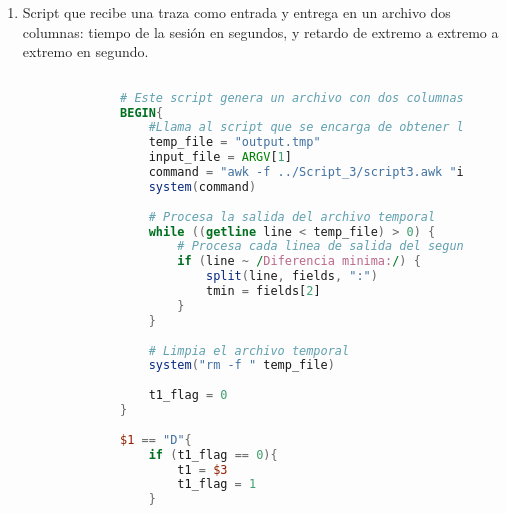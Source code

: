 \begin{enumerate}
\begin{figure}[H]
\begin{lstlisting}[frame=single, breaklines=true, basicstyle=\footnotesize\ttfamily, breakatwhitespace=false, 
        columns=flexible, tabsize=2, showstringspaces=false, language=AWK]
        $1 == "D"{  # Solo se calcula la diferencia cuando hay un paquete recibido
            diff = $2 - $3 # Ya que solo es la diferencia no se toma encuenta que el numero que se obtiene puede ser negativo
            if (diff < min_diff){
                min_diff = diff
            }
        }

        END{
            print "Archivo de entrada:", input_file
            print "Diferencia minima:", min_diff   
            print ""
        }

    \end{lstlisting}
    \label{fig:scriptDiferencia}
  \end{figure}

  \noindent Para la ejecuci\'on de este script usaremos como base la forma vista en el punto anterior. 
  Cambiando el nombre del script de \textit{script2.awk} a \textit{script3.awk}

  \item Script que recibe una traza como entrada y entrega en un archivo dos columnas: tiempo de la sesi\'on en segundos, 
  y retardo de extremo a extremo a extremo en segundo.
  \begin{figure}[H]
    \centering
    \begin{lstlisting}[frame=single, breaklines=true, basicstyle=\footnotesize\ttfamily, breakatwhitespace=false, 
        columns=flexible, tabsize=2, showstringspaces=false, language=AWK] 
  
        # Este script genera un archivo con dos columnas: tiempo de la sesion y retardo extremo a extremo.
        BEGIN{
            #Llama al script que se encarga de obtener la diferencia minima
            temp_file = "output.tmp"
            input_file = ARGV[1]
            command = "awk -f ../Script_3/script3.awk "input_file " > " temp_file
            system(command)
        
            # Procesa la salida del archivo temporal
            while ((getline line < temp_file) > 0) {
                # Procesa cada linea de salida del segundo script
                if (line ~ /Diferencia minima:/) {
                    split(line, fields, ":")
                    tmin = fields[2]
                }
            }
        
            # Limpia el archivo temporal
            system("rm -f " temp_file)
        
            t1_flag = 0
        }
        
        $1 == "D"{
            if (t1_flag == 0){
                t1 = $3
                t1_flag = 1
            }
        

\end{lstlisting}
\end{figure}
\end{enumerate}
